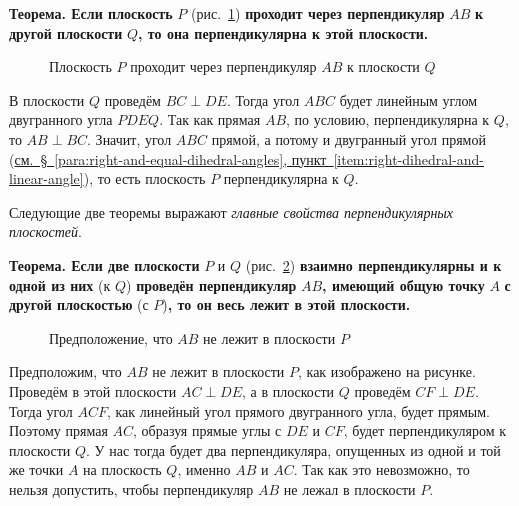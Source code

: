  \textbf{Теорема. Если плоскость} \(P\) (рис.~\ref{fig:kiselev-stereo-337}) \textbf{проходит через перпендикуляр} \(AB\) \textbf{к другой плоскости} \(Q\)\textbf{, то она перпендикулярна к этой плоскости.}

\begin{figure}[htbp]
    \centering
    \renewcommand{\thefigure}{337}
    \captionsetup{name=Рис.,labelsep=period}
    
    \caption{Плоскость \(P\) проходит через перпендикуляр \(AB\) к плоскости \(Q\)}\label{fig:kiselev-stereo-337}
\end{figure}

В плоскости \(Q\) проведём \(BC\perp DE\). Тогда угол \(ABC\) будет линейным углом двугранного угла \(PDEQ\). Так как прямая \(AB\), по условию, перпендикулярна к \(Q\), то \(AB\perp BC\). Значит, угол \(ABC\) прямой, а потому и двугранный угол прямой (\hyperref[item:right-dihedral-and-linear-angle]{см.~§~\ref*{para:right-and-equal-dihedral-angles}, пункт~\ref*{item:right-dihedral-and-linear-angle}}), то есть плоскость \(P\) перпендикулярна к \(Q\).

Следующие две теоремы выражают \emph{главные свойства перпендикулярных плоскостей}.

 \textbf{Теорема. Если две плоскости} \(P\) и \(Q\) (рис.~\ref{fig:kiselev-stereo-338}) \textbf{взаимно перпендикулярны и к одной из них} (к \(Q\)) \textbf{проведён перпендикуляр} \(AB\)\textbf{, имеющий общую точку} \(A\) \textbf{с другой плоскостью} (с \(P\))\textbf{, то он весь лежит в этой плоскости.}

\begin{figure}[htbp]
    \centering
    \renewcommand{\thefigure}{338}
    \captionsetup{name=Рис.,labelsep=period}
    
    \caption{Предположение, что \(AB\) не лежит в плоскости \(P\)}\label{fig:kiselev-stereo-338}
\end{figure}

Предположим, что \(AB\) не лежит в плоскости \(P\), как изображено на рисунке. Проведём в этой плоскости \(AC\perp DE\), а в плоскости \(Q\) проведём \(CF\perp DE\). Тогда угол \(ACF\), как линейный угол прямого двугранного угла, будет прямым. Поэтому прямая \(AC\), образуя прямые углы с \(DE\) и \(CF\), будет перпендикуляром к плоскости \(Q\). У нас тогда будет два перпендикуляра, опущенных из одной и той же точки \(A\) на плоскость \(Q\), именно \(AB\) и \(AC\). Так как это невозможно, то нельзя допустить, чтобы перпендикуляр \(AB\) не лежал в плоскости \(P\).

